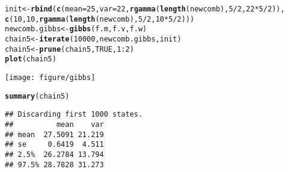 \documentclass{article}\usepackage[]{graphicx}\usepackage[]{color}
\makeatletter
\def\maxwidth{ %
  \ifdim\Gin@nat@width>\linewidth
    \linewidth
  \else
    \Gin@nat@width
  \fi
}
\newcommand{\hlnum}[1]{\textcolor[rgb]{0.686,0.059,0.569}{#1}}%
\newcommand{\hlopt}[1]{\textcolor[rgb]{0,0,0}{#1}}%
\newcommand{\hlstd}[1]{\textcolor[rgb]{0.345,0.345,0.345}{#1}}%
\newcommand{\hlkwb}[1]{\textcolor[rgb]{0.69,0.353,0.396}{#1}}%
\newcommand{\hlkwc}[1]{\textcolor[rgb]{0.333,0.667,0.333}{#1}}%
\newcommand{\hlkwd}[1]{\textcolor[rgb]{0.737,0.353,0.396}{\textbf{#1}}}%
\newenvironment{kframe}{%
 \def\at@end@of@kframe{}%
 \ifinner\ifhmode%
  \def\at@end@of@kframe{\end{minipage}}%
  \begin{minipage}{\columnwidth}%
 \fi\fi%
 \def\FrameCommand##1{\hskip\@totalleftmargin \hskip-\fboxsep
 \colorbox{shadecolor}{##1}\hskip-\fboxsep
     \hskip-\linewidth \hskip-\@totalleftmargin \hskip\columnwidth}%
 \MakeFramed {\advance\hsize-\width
   \@totalleftmargin\z@ \linewidth\hsize
   \@setminipage}}%
 {\par\unskip\endMakeFramed%
 \at@end@of@kframe}
\newenvironment{knitrout}{}{} %
\makeatother
\begin{document}
\begin{knitrout}
\color{fgcolor}\begin{kframe}
\begin{alltt}
\hlstd{init} \hlkwb{<-} \hlkwd{rbind}\hlstd{(}\hlkwd{c}\hlstd{(}\hlkwc{mean} \hlstd{=} \hlnum{25}\hlstd{,} \hlkwc{var} \hlstd{=} \hlnum{22}\hlstd{,} \hlkwd{rgamma}\hlstd{(}\hlkwd{length}\hlstd{(newcomb),} \hlnum{5}\hlopt{/}\hlnum{2}\hlstd{,} \hlnum{22} \hlopt{*} \hlnum{5}\hlopt{/}\hlnum{2}\hlstd{)),}
    \hlkwd{c}\hlstd{(}\hlnum{10}\hlstd{,} \hlnum{10}\hlstd{,} \hlkwd{rgamma}\hlstd{(}\hlkwd{length}\hlstd{(newcomb),} \hlnum{5}\hlopt{/}\hlnum{2}\hlstd{,} \hlnum{10} \hlopt{*} \hlnum{5}\hlopt{/}\hlnum{2}\hlstd{)))}
\hlstd{newcomb.gibbs} \hlkwb{<-} \hlkwd{gibbs}\hlstd{(f.m, f.v, f.w)}
\hlstd{chain5} \hlkwb{<-} \hlkwd{iterate}\hlstd{(}\hlnum{10000}\hlstd{, newcomb.gibbs, init)}
\hlstd{chain5} \hlkwb{<-} \hlkwd{prune}\hlstd{(chain5,} \hlnum{TRUE}\hlstd{,} \hlnum{1}\hlopt{:}\hlnum{2}\hlstd{)}
\hlkwd{plot}\hlstd{(chain5)}
\end{alltt}
\end{kframe}
\texttt{[image: figure/gibbs]} 
\begin{kframe}\begin{alltt}
\hlkwd{summary}\hlstd{(chain5)}
\end{alltt}
\begin{verbatim}
## Discarding first 1000 states.
##          mean    var
## mean  27.5091 21.219
## se     0.6419  4.511
## 2.5%  26.2784 13.794
## 97.5% 28.7828 31.273
\end{verbatim}
\end{kframe}
\end{knitrout}
\end{document}
